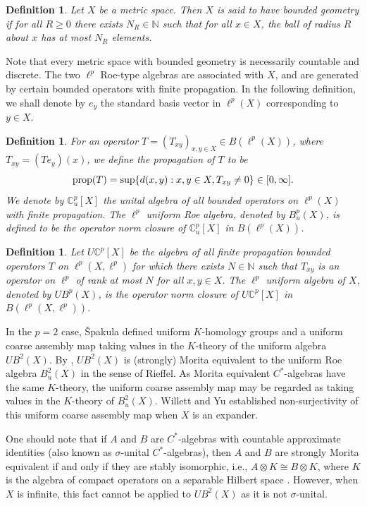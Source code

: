 \documentclass[a4,11pt]{amsart}
\newtheorem{defn}[thm]{Definition}
\theoremstyle{remark}
\begin{document}
\begin{defn}
Let $X$ be a metric space. Then $X$ is said to have \emph{bounded geometry} if for all $R\geq 0$ there exists $N_R\in\mathbb{N}$ such that for all $x\in X$, the ball of radius $R$ about $x$ has at most $N_R$ elements.
\end{defn}

Note that every metric space with bounded geometry is necessarily countable and discrete.
The two $\ell^p$ Roe-type algebras are associated with $X$, and are generated by certain bounded operators with finite propagation.
In the following definition, we shall denote by $e_y$ the standard basis vector in $\ell^p(X)$ corresponding to $y\in X$.

\begin{defn} 
For an operator $T=(T_{xy})_{x,y\in X}\in B(\ell^p(X))$, where $T_{xy}=(Te_y)(x)$, we define the propagation of $T$ to be
\[ \mathop{\rm prop}(T)=\sup\{ d(x,y):x,y\in X,T_{xy}\neq 0 \}\in[0,\infty]. \]
We denote by $\mathbb{C}_u^p[X]$ the unital algebra of all bounded operators on $\ell^p(X)$ with finite propagation. The $\ell^p$ uniform Roe algebra, denoted by $B^p_u(X)$, is defined to be the operator norm closure of $\mathbb{C}_u^p[X]$ in $B(\ell^p(X))$.
\end{defn}


\begin{defn}
Let $U\mathbb{C}^p[X]$ be the algebra of all finite propagation bounded operators $T$ on $\ell^p(X,\ell^p)$ for which there exists $N\in\mathbb{N}$ such that $T_{xy}$ is an operator on $\ell^p$ of rank at most $N$ for all $x,y\in X$.
The $\ell^p$ uniform algebra of $X$, denoted by $UB^p(X)$, is the operator norm closure of $U\mathbb{C}^p[X]$ in $B(\ell^p(X,\ell^p))$.
\end{defn}


In the $p=2$ case, \v{S}pakula \cite{Spa09} defined uniform $K$-homology groups and a uniform coarse assembly map taking values in the $K$-theory of the uniform algebra $UB^2(X)$. 
By \cite[Proposition 4.7]{SW13}, $UB^2(X)$ is (strongly) Morita equivalent to the uniform Roe algebra $B^2_u(X)$ in the sense of Rieffel. As Morita equivalent $C^*$-algebras have the same $K$-theory, the uniform coarse assembly map may be regarded as taking values in the $K$-theory of $B^2_u(X)$.
Willett and Yu \cite[Theorem A.3]{WY12} established non-surjectivity of this uniform coarse assembly map when $X$ is an expander.

One should note that if $A$ and $B$ are $C^*$-algebras with countable approximate identities (also known as $\sigma$-unital $C^*$-algebras), then $A$ and $B$ are strongly Morita equivalent if and only if they are stably isomorphic, i.e., $A\otimes K\cong B\otimes K$, where $K$ is the algebra of compact operators on a separable Hilbert space \cite{BGR}.
However, when $X$ is infinite, this fact cannot be applied to $UB^2(X)$ as it is not $\sigma$-unital. 
\end{document}
